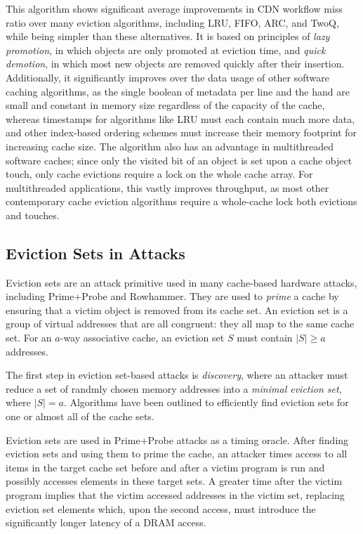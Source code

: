 \documentclass[letterpaper]{article}
\begin{document}
This algorithm shows significant average improvements in CDN workflow miss ratio
over many eviction algorithms,
including LRU, FIFO, ARC, and TwoQ, while being simpler than these alternatives.
It is based on principles of \textit{lazy promotion},
in which objects are only promoted at eviction time,
and \textit{quick demotion}, in which most new objects are removed quickly after their insertion.
Additionally, it significantly improves over the data usage of other
software caching algorithms, as the single boolean of metadata per line and the hand
are small and constant in memory size regardless of the capacity of the cache,
whereas timestamps for algorithms like LRU must each contain much more data,
and other index-based ordering schemes must increase their memory footprint for increasing cache size.
The algorithm also has an advantage in multithreaded software caches;
since only the visited bit of an object is set upon a cache object touch,
only cache evictions require a lock on the whole cache array.
For multithreaded applications, this vastly improves throughput,
as most other contemporary cache eviction algorithms require a whole-cache lock
both evictions and touches.

\subsection{Eviction Sets in Attacks}

Eviction sets are an attack primitive used in many cache-based hardware attacks,
including Prime+Probe and Rowhammer.
They are used to \textit{prime} a cache by ensuring that a victim object is removed from its cache set.
An eviction set is a group of virtual addresses that are all congruent: they all map to the same cache set.
For an $a$-way associative cache, an eviction set $S$ must contain $|S| \geq a$ addresses.

The first step in eviction set-based attacks is \textit{discovery},
where an attacker must reduce a set of randmly chosen memory addresses
into a \textit{minimal eviction set}, where $|S| = a$.
Algorithms have been outlined to efficiently find eviction sets for one or almost all
of the cache sets.

Eviction sets are used in Prime+Probe attacks as a timing oracle.
After finding eviction sets and using them to prime the cache,
an attacker times access to all items in the target cache set
before and after a victim program is run and possibly accesses elements in these target sets.
A greater time after the victim program implies that the victim accessed addresses in the victim set,
replacing eviction set elements which, upon the second access,
must introduce the significantly longer latency of a DRAM access.
\end{document}
